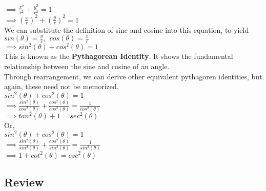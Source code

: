 \tab$\implies \frac{x^2}{r^2} + \frac{y^2}{r^2} = 1$\\

\tab$\implies (\frac{x}{r})^2 + (\frac{y}{r})^2 = 1$\\

We can substitute the definition of sine and cosine into this equation, to yield\\

\tab$sin(\theta) = \frac{y}{r}, \ \ cos(\theta) = \frac{x}{r}$\\

\tab$\implies sin^2(\theta) + cos^2(\theta) = 1$\\

This is known as the {\bf Pythagorean Identity}.  It shows the fundamental relationship between the sine and cosine of an angle.\\

Through rearrangement, we can derive other equivalent pythagoren identities, but again, these need not be memorized.\\

\tab$sin^2(\theta) + cos^2(\theta) = 1$\\

\tab$\implies \frac{sin^2(\theta)}{cos^2(\theta)} + \frac{cos^2(\theta)}{cos^2(\theta)} = \frac{1}{cos^2(\theta)}$\\

\tab$\implies tan^2(\theta) + 1 = sec^2(\theta)$\\

Or,\\

\tab$sin^2(\theta) + cos^2(\theta) = 1$\\

\tab$\implies \frac{sin^2(\theta)}{sin^2(\theta)} + \frac{cos^2(\theta)}{sin^2(\theta)} = \frac{1}{sin^2(\theta)}$\\

\tab$\implies 1 + cot^2(\theta) = csc^2(\theta)$\\

\subsection{Review}

